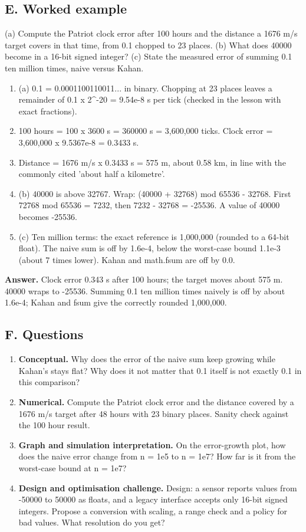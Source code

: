 \documentclass[11pt,a4paper]{article}
\begin{document}
\subsection*{E. Worked example}
(a) Compute the Patriot clock error after 100 hours and the distance a 1676 m/s target covers in that time, from 0.1 chopped to 23 places. (b) What does 40000 become in a 16-bit signed integer? (c) State the measured error of summing 0.1 ten million times, naive versus Kahan.
\begin{enumerate}[nosep]
\item (a) 0.1 = 0.0001100110011... in binary. Chopping at 23 places leaves a remainder of 0.1 x 2\textasciicircum{}-20 = 9.54e-8 s per tick (checked in the lesson with exact fractions).
\item 100 hours = 100 x 3600 s = 360000 s = 3,600,000 ticks. Clock error = 3,600,000 x 9.5367e-8 = 0.3433 s.
\item Distance = 1676 m/s x 0.3433 s = 575 m, about 0.58 km, in line with the commonly cited 'about half a kilometre'.
\item (b) 40000 is above 32767. Wrap: (40000 + 32768) mod 65536 - 32768. First 72768 mod 65536 = 7232, then 7232 - 32768 = -25536. A value of 40000 becomes -25536.
\item (c) Ten million terms: the exact reference is 1,000,000 (rounded to a 64-bit float). The naive sum is off by 1.6e-4, below the worst-case bound 1.1e-3 (about 7 times lower). Kahan and math.fsum are off by 0.0.
\end{enumerate}
\textbf{Answer.} Clock error 0.343 s after 100 hours; the target moves about 575 m. 40000 wraps to -25536. Summing 0.1 ten million times naively is off by about 1.6e-4; Kahan and fsum give the correctly rounded 1,000,000.

\subsection*{F. Questions}
\begin{enumerate}[nosep]
\item \textbf{Conceptual.} Why does the error of the naive sum keep growing while Kahan's stays flat? Why does it not matter that 0.1 itself is not exactly 0.1 in this comparison?
\item \textbf{Numerical.} Compute the Patriot clock error and the distance covered by a 1676 m/s target after 48 hours with 23 binary places. Sanity check against the 100 hour result.
\item \textbf{Graph and simulation interpretation.} On the error-growth plot, how does the naive error change from n = 1e5 to n = 1e7? How far is it from the worst-case bound at n = 1e7?
\item \textbf{Design and optimisation challenge.} Design: a sensor reports values from -50000 to 50000 as floats, and a legacy interface accepts only 16-bit signed integers. Propose a conversion with scaling, a range check and a policy for bad values. What resolution do you get?
\end{enumerate}
\end{document}
